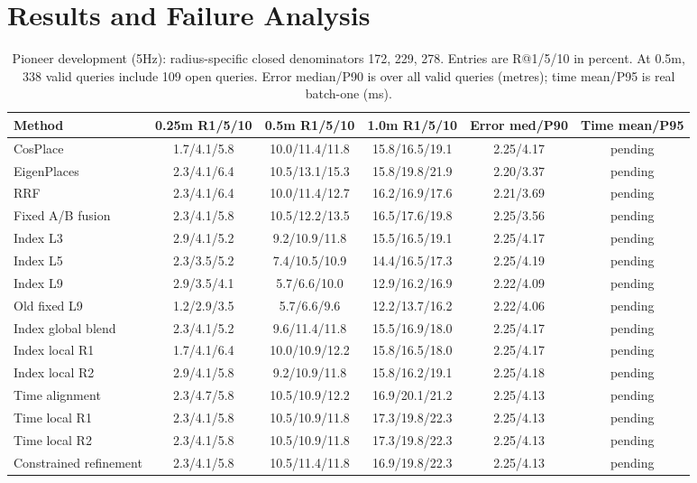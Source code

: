 \documentclass[conference,letterpaper]{IEEEtran}
\begin{document}
\section{Results and Failure Analysis}
\begin{table}[t]
\centering\caption{Pioneer development (5Hz): radius-specific closed denominators 172, 229, 278. Entries are R@1/5/10 in percent. At 0.5m, 338 valid queries include 109 open queries. Error median/P90 is over all valid queries (metres); time mean/P95 is real batch-one (ms).}
\label{tab:dev}
\scriptsize\setlength{\tabcolsep}{5pt}
\begin{tabular}{lccccc}\hline
Method & 0.25m R1/5/10 & 0.5m R1/5/10 & 1.0m R1/5/10 & Error med/P90 & Time mean/P95\\\hline
CosPlace & 1.7/4.1/5.8 & 10.0/11.4/11.8 & 15.8/16.5/19.1 & 2.25/4.17 & pending \\
EigenPlaces & 2.3/4.1/6.4 & 10.5/13.1/15.3 & 15.8/19.8/21.9 & 2.20/3.37 & pending \\
RRF & 2.3/4.1/6.4 & 10.0/11.4/12.7 & 16.2/16.9/17.6 & 2.21/3.69 & pending \\
Fixed A/B fusion & 2.3/4.1/5.8 & 10.5/12.2/13.5 & 16.5/17.6/19.8 & 2.25/3.56 & pending \\
Index L3 & 2.9/4.1/5.2 & 9.2/10.9/11.8 & 15.5/16.5/19.1 & 2.25/4.17 & pending \\
Index L5 & 2.3/3.5/5.2 & 7.4/10.5/10.9 & 14.4/16.5/17.3 & 2.25/4.19 & pending \\
Index L9 & 2.9/3.5/4.1 & 5.7/6.6/10.0 & 12.9/16.2/16.9 & 2.22/4.09 & pending \\
Old fixed L9 & 1.2/2.9/3.5 & 5.7/6.6/9.6 & 12.2/13.7/16.2 & 2.22/4.06 & pending \\
Index global blend & 2.3/4.1/5.2 & 9.6/11.4/11.8 & 15.5/16.9/18.0 & 2.25/4.17 & pending \\
Index local R1 & 1.7/4.1/6.4 & 10.0/10.9/12.2 & 15.8/16.5/18.0 & 2.25/4.17 & pending \\
Index local R2 & 2.9/4.1/5.8 & 9.2/10.9/11.8 & 15.8/16.2/19.1 & 2.25/4.18 & pending \\
Time alignment & 2.3/4.7/5.8 & 10.5/10.9/12.2 & 16.9/20.1/21.2 & 2.25/4.13 & pending \\
Time local R1 & 2.3/4.1/5.8 & 10.5/10.9/11.8 & 17.3/19.8/22.3 & 2.25/4.13 & pending \\
Time local R2 & 2.3/4.1/5.8 & 10.5/10.9/11.8 & 17.3/19.8/22.3 & 2.25/4.13 & pending \\
Constrained refinement & 2.3/4.1/5.8 & 10.5/11.4/11.8 & 16.9/19.8/22.3 & 2.25/4.13 & pending \\
\hline\end{tabular}\end{table}
\end{document}
